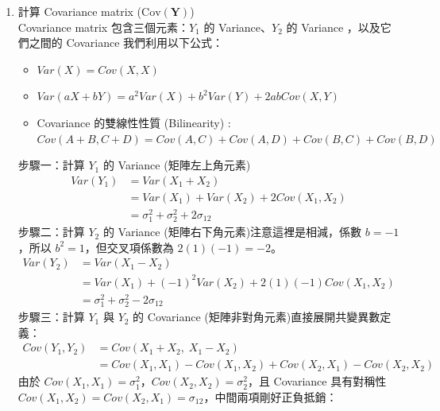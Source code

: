 \documentclass{article}
\begin{document}
\begin{enumerate}
\begin{itemize}
    \end{itemize}
    所以期望值向量為：
    $$\mathbb{E}[\bm Y] = 
    \begin{pmatrix} 
        \mathbb{E}(Y_1) \\ \mathbb{E}(Y_2) 
    \end{pmatrix} = 
    \begin{pmatrix} \mu_1 + \mu_2 \\ \mu_1 - \mu_2 \end{pmatrix}$$
    \item 計算 Covariance matrix ($\mathrm{Cov}(\bm Y)$)\\
    Covariance matrix 包含三個元素：$Y_1$ 的 Variance、$Y_2$ 的 Variance ，以及它們之間的 Covariance
    我們利用以下公式：
    \begin{itemize}
        \item $Var(X) = Cov(X, X)$
        \item $Var(aX + bY) = a^2 Var(X) + b^2 Var(Y) + 2ab Cov(X, Y)$
        \item Covariance 的雙線性性質 (Bilinearity) :
        $Cov(A+B, C+D) = Cov(A,C) + Cov(A,D) + Cov(B,C) + Cov(B,D)$
    \end{itemize}
    步驟一：計算 $Y_1$ 的 Variance (矩陣左上角元素)
    \begin{align*}
        Var(Y_1) &= Var(X_1 + X_2) \\
        &= Var(X_1) + Var(X_2) + 2 Cov(X_1, X_2) \\
        &= \sigma_1^2 + \sigma_2^2 + 2\sigma_{12}
    \end{align*}
    步驟二：計算 $Y_2$ 的 Variance (矩陣右下角元素)注意這裡是相減，係數 $b=-1$，所以 $b^2=1$，但交叉項係數為 $2(1)(-1)=-2$。
    \begin{align*}
        Var(Y_2) &= Var(X_1 - X_2) \\
        &= Var(X_1) + (-1)^2 Var(X_2) + 2(1)(-1) Cov(X_1, X_2) \\
        &= \sigma_1^2 + \sigma_2^2 - 2\sigma_{12}
        \end{align*}
    步驟三：計算 $Y_1$ 與 $Y_2$ 的 Covariance (矩陣非對角元素)直接展開共變異數定義：
    \begin{align*}
        Cov(Y_1, Y_2) &= Cov(X_1 + X_2, \; X_1 - X_2) \\
        &= Cov(X_1, X_1) - Cov(X_1, X_2) + Cov(X_2, X_1) - Cov(X_2, X_2)
    \end{align*}
    由於 $Cov(X_1, X_1) = \sigma_1^2$，$Cov(X_2, X_2) = \sigma_2^2$，且 Covariance 具有對稱性 
    $Cov(X_1, X_2) = Cov(X_2, X_1) = \sigma_{12}$，中間兩項剛好正負抵銷：

\end{enumerate}
\end{document}

